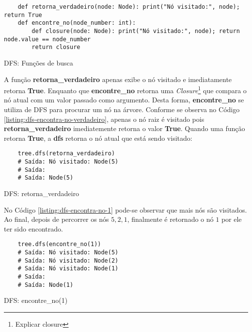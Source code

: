 \begin{listing}[!ht]
    \begin{verbatim}
    def retorna_verdadeiro(node: Node): print("Nó visitado:", node); return True
    def encontre_no(node_number: int):
        def closure(node: Node): print("Nó visitado:", node); return node.value == node_number
        return closure
    \end{verbatim}
    \caption{DFS: Funções de busca}
    \label{listing:dfs-encontra-no-funcoes}
\end{listing}
A função \textbf{retorna\_verdadeiro} apenas exibe o nó visitado e imediatamente retorna \textbf{True}. Enquanto que \textbf{encontre\_no}
retorna uma \textit{Closure}\footnote{
    Explicar closure
}
que compara o nó atual com um valor passado como argumento. Desta forma, \textbf{encontre\_no} se utiliza de DFS para procurar um nó na árvore.\linebreak
Conforme se observa no Código \ref{listing:dfs-encontra-no-verdadeiro}, apenas o nó raiz é visitado pois \textbf{retorna\_verdadeiro} imediatemente retorna
o valor \textbf{True}. Quando uma função retorna \textbf{True}, a \textbf{dfs} retorna o nó atual que está sendo visitado:

\begin{listing}[!ht]
    \begin{verbatim}
    tree.dfs(retorna_verdadeiro)
    # Saída: Nó visitado: Node(5)
    # Saída: 
    # Saída: Node(5)
    \end{verbatim}
    \caption{DFS: retorna_verdadeiro}
    \label{listing:dfs-encontra-no-verdadeiro}
\end{listing}

No Código \ref{listing:dfs-encontra-no-1} pode-se observar que mais nós são visitados. Ao final, depois de percorrer
os nós $5,2,1$, finalmente é retornado o nó $1$ por ele ter sido encontrado.

\begin{listing}[!ht]
    \begin{verbatim}
    tree.dfs(encontre_no(1))
    # Saída: Nó visitado: Node(5)
    # Saída: Nó visitado: Node(2)
    # Saída: Nó visitado: Node(1)
    # Saída: 
    # Saída: Node(1)
    \end{verbatim}
    \caption{DFS: encontre_no(1)}
    \label{listing:dfs-encontra-no-1}
\end{listing}

